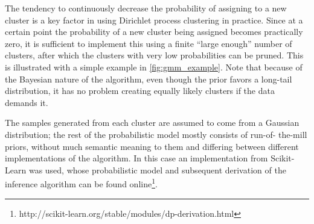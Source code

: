 The tendency to continuously decrease the probability of assigning to a new
cluster is a key factor in using Dirichlet process clustering in practice.
Since at a certain point the probability of a new cluster being assigned
becomes practically zero, it is sufficient to implement this using a finite
``large enough'' number of clusters, after which the clusters with very low
probabilities can be pruned. This is illustrated with a simple example in
\cref{fig:gmm_example}. Note that because of the Bayesian nature of the
algorithm, even though the prior favors a long-tail distribution, it has no
problem creating equally likely clusters if the data demands it.

The samples generated from each cluster are assumed to come from a Gaussian
distribution; the rest of the probabilistic model mostly consists of run-of-
the-mill priors, without much semantic meaning to them and differing between
different implementations of the algorithm. In this case an implementation
from Scikit-Learn\cite{scikit-learn} was used, whose probabilistic model and
subsequent derivation of the inference algorithm can be found
online\footnote{http://scikit-learn.org/stable/modules/dp-derivation.html}.

